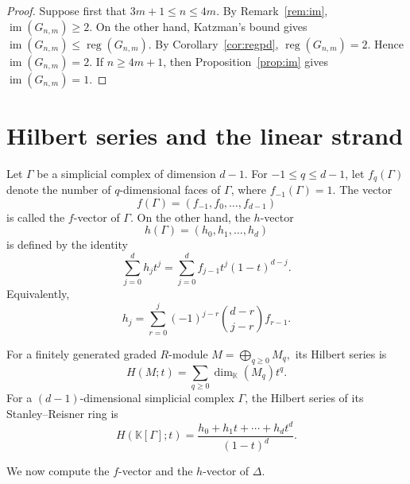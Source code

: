 \documentclass[12pt,reqno]{amsart}
\theoremstyle{definition}
\numberwithin{equation}{section}
\def\K{\mathbb{K}}
\newcommand{\reg}{\operatorname{reg}}
\begin{document}
\begin{proof}
	Suppose first that $3m+1\leq n\leq4m$. By Remark~\ref{rem:im},
	\( \operatorname{im}(G_{n,m})\geq2. \)
	On the other hand, Katzman's bound gives \( 	\operatorname{im}(G_{n,m})
	\leq
	\reg(G_{n,m}). \)
	By Corollary~\ref{cor:regpd}, \( \reg(G_{n,m})=2. \)
	Hence \( \operatorname{im}(G_{n,m})=2. \)
	If $n\geq4m+1$, then Proposition~\ref{prop:im} gives \( \operatorname{im}(G_{n,m})=1. \)
\end{proof}

\section{Hilbert series and the linear strand}
\noindent
Let $\Gamma$ be a simplicial complex of dimension $d-1$. For
$-1\leq q\leq d-1$, let $f_q(\Gamma)$ denote the number of
$q$-dimensional faces of $\Gamma$, where $f_{-1}(\Gamma)=1$. The vector
\[
f(\Gamma)
=
(f_{-1},f_0,\ldots,f_{d-1})
\]
is called the $f$-vector of $\Gamma$.
On the other hand, the $h$-vector
\[
h(\Gamma)=(h_0,h_1,\ldots,h_d)
\]
is defined by the identity
\[
\sum_{j=0}^{d}h_jt^j
=
\sum_{j=0}^{d}
f_{j-1}t^j(1-t)^{d-j}.
\]
Equivalently,
\[
h_j
=
\sum_{r=0}^{j}
(-1)^{j-r}
\binom{d-r}{j-r}f_{r-1}.
\]

For a finitely generated graded $R$-module \( M=\bigoplus_{q\geq0}M_q, \) its Hilbert series is
\[
H(M;t)
=
\sum_{q\geq0}
\dim_{\K}(M_q)t^q.
\]
For a $(d-1)$-dimensional simplicial complex $\Gamma$, the Hilbert series
of its Stanley--Reisner ring is
\[
H(\K[\Gamma];t)
=
\frac{h_0+h_1t+\cdots+h_dt^d}{(1-t)^d}.
\]

We now compute the $f$-vector and the $h$-vector of $\Delta$.
\end{document}
